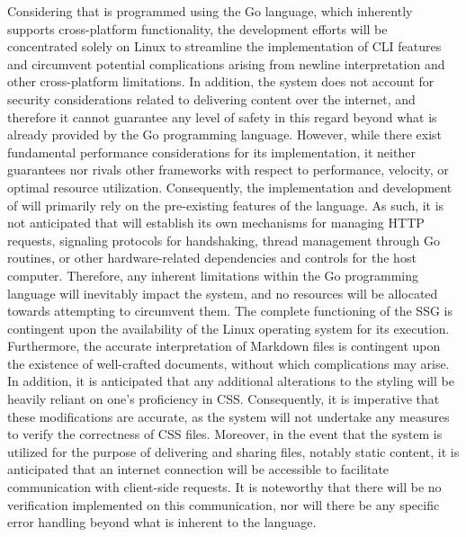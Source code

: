 {}\markdownRendererInterblockSeparator
{}Considering that  is programmed using the Go language, which inherently supports cross-platform functionality, the development efforts will be concentrated solely on Linux to streamline the implementation of CLI features and circumvent potential complications arising from newline interpretation and other cross-platform limitations.\markdownRendererInterblockSeparator
{}In addition, the system does not account for security considerations related to delivering content over the internet, and therefore it cannot guarantee any level of safety in this regard beyond what is already provided by the Go programming language.\markdownRendererInterblockSeparator
{}However, while there exist fundamental performance considerations for its implementation, it neither guarantees nor rivals other frameworks with respect to performance, velocity, or optimal resource utilization.\markdownRendererInterblockSeparator
{}Consequently, the implementation and development of  will primarily rely on the pre-existing features of the language. As such, it is not anticipated that  will establish its own mechanisms for managing HTTP requests, signaling protocols for handshaking, thread management through Go routines, or other hardware-related dependencies and controls for the host computer. Therefore, any inherent limitations within the Go programming language will inevitably impact the system, and no resources will be allocated towards attempting to circumvent them.\markdownRendererInterblockSeparator
{}\markdownRendererInterblockSeparator
{}The complete functioning of the SSG is contingent upon the availability of the Linux operating system for its execution. Furthermore, the accurate interpretation of Markdown files is contingent upon the existence of well-crafted documents, without which complications may arise.\markdownRendererInterblockSeparator
{}In addition, it is anticipated that any additional alterations to the styling will be heavily reliant on one's proficiency in CSS. Consequently, it is imperative that these modifications are accurate, as the system will not undertake any measures to verify the correctness of CSS files.\markdownRendererInterblockSeparator
{}Moreover, in the event that the system is utilized for the purpose of delivering and sharing files, notably static content, it is anticipated that an internet connection will be accessible to facilitate communication with client-side requests. It is noteworthy that there will be no verification implemented on this communication, nor will there be any specific error handling beyond what is inherent to the language.\markdownRendererInterblockSeparator
